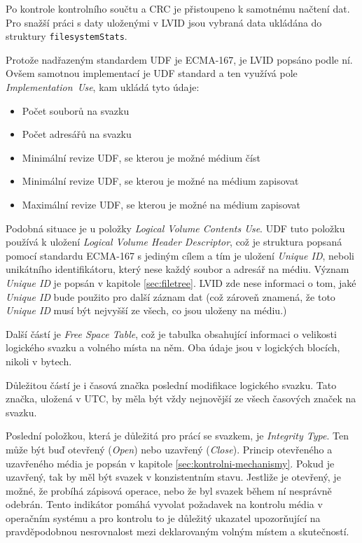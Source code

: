 Po kontrole kontrolního součtu a CRC je přistoupeno k samotnému načtení dat. Pro snažší práci s daty uloženými v LVID jsou vybraná data ukládána do struktury \texttt{filesystemStats}.

Protože nadřazeným standardem UDF je ECMA-167, je LVID popsáno podle ní. Ovšem samotnou implementací je UDF standard a ten využívá pole \textit{Implementation~Use}, kam ukládá tyto údaje:
\begin{itemize}
    \item Počet souborů na svazku
    \item Počet adresářů na svazku
    \item Minimální revize UDF, se kterou je možné médium číst
    \item Minimální revize UDF, se kterou je možné na médium zapisovat
    \item Maximální revize UDF, se kterou je možné na médium zapisovat
\end{itemize}
Podobná situace je u položky \textit{Logical Volume Contents Use}. UDF tuto položku používá k uložení \textit{Logical Volume Header Descriptor}, což je struktura popsaná pomocí standardu ECMA-167 s jediným cílem a tím je uložení \textit{Unique ID}, neboli unikátního identifikátoru, který nese každý soubor a adresář na médiu. Význam \textit{Unique ID} je popsán v kapitole \ref{sec:filetree}. LVID zde nese informaci o tom, jaké \textit{Unique ID} bude použito pro další záznam dat (což zároveň znamená, že toto \textit{Unique ID} musí být nejvyšší ze všech, co jsou uloženy na médiu.)

Další částí je \textit{Free Space Table}, což je tabulka obsahující informaci o velikosti logického svazku a volného místa na něm. Oba údaje jsou v logických blocích, nikoli v bytech.

Důležitou částí je i časová značka poslední modifikace logického svazku. Tato značka, uložená v UTC, by měla být vždy nejnovější ze všech časových značek na svazku.

Poslední položkou, která je důležitá pro prácí se svazkem, je \textit{Integrity Type}. Ten může být buď otevřený (\textit{Open}) nebo uzavřený (\textit{Close}). Princip otevřeného a uzavřeného média je popsán v kapitole \ref{sec:kontrolni-mechanismy}. Pokud je uzavřený, tak by měl být svazek v konzistentním stavu. Jestliže je otevřený, je možné, že probíhá zápisová operace, nebo že byl svazek během ní nesprávně odebrán. Tento indikátor pomáhá vyvolat požadavek na kontrolu média v operačním systému a pro kontrolu to je důležitý ukazatel upozorňující na pravděpodobnou nesrovnalost mezi deklarovaným volným místem a skutečností.
 
